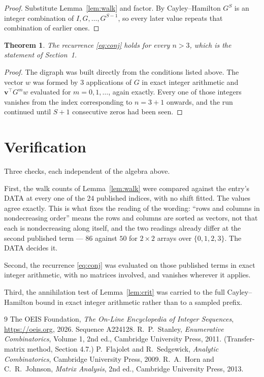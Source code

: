 \documentclass[11pt,a4paper]{article}
\theoremstyle{plain}
\newtheorem{theorem}{Theorem}
\theoremstyle{definition}
\begin{document}
\begin{proof}
Substitute Lemma~\ref{lem:walk} and factor. By Cayley--Hamilton $G^{S}$ is an integer
combination of $I,G,\dots,G^{S-1}$, so every later value repeats that combination of
earlier ones.
\end{proof}

\begin{theorem}
The recurrence \eqref{eq:conj} holds for every $n>3$, which is the statement of
Section~1.
\end{theorem}

\begin{proof}
The digraph was built directly from the conditions listed above. The vector $w$ was formed by
$3$ applications of $G$ in exact integer arithmetic and $\mathbf{v}^{\!\top}G^{m}w$
evaluated for $m=0,1,\dots$, again exactly. Every one of those integers vanishes from the
index corresponding to $n=3+1$ onwards, and the run continued until $S+1$ consecutive
zeros had been seen.
\end{proof}

\section{Verification}

Three checks, each independent of the algebra above.

First, the walk counts of Lemma~\ref{lem:walk} were compared against the entry's DATA at
every one of the $24$ published indices, with no shift fitted. The values agree exactly.
This is what fixes the reading of the wording: ``rows and columns in nondecreasing order''
means the rows and columns are sorted as vectors, not that each is nondecreasing along
itself, and the two readings already differ at the second published term --- $86$ against
$50$ for $2\times2$ arrays over $\{0,1,2,3\}$. The DATA decides it.

Second, the recurrence \eqref{eq:conj} was evaluated on those published terms in exact
integer arithmetic, with no matrices involved, and vanishes wherever it applies.

Third, the annihilation test of Lemma~\ref{lem:crit} was carried to the full
Cayley--Hamilton bound in exact integer arithmetic rather than to a sampled prefix.

\begin{thebibliography}{9}
 The OEIS Foundation, \emph{The On-Line Encyclopedia of Integer
Sequences}, \url{https://oeis.org}, 2026. Sequence A224128.
 R.~P.~Stanley, \emph{Enumerative Combinatorics}, Volume 1, 2nd ed.,
Cambridge University Press, 2011. (Transfer-matrix method, Section 4.7.)
 P.~Flajolet and R.~Sedgewick, \emph{Analytic Combinatorics}, Cambridge
University Press, 2009.
 R.~A.~Horn and C.~R.~Johnson, \emph{Matrix Analysis}, 2nd ed., Cambridge
University Press, 2013.
\end{thebibliography}
\end{document}
